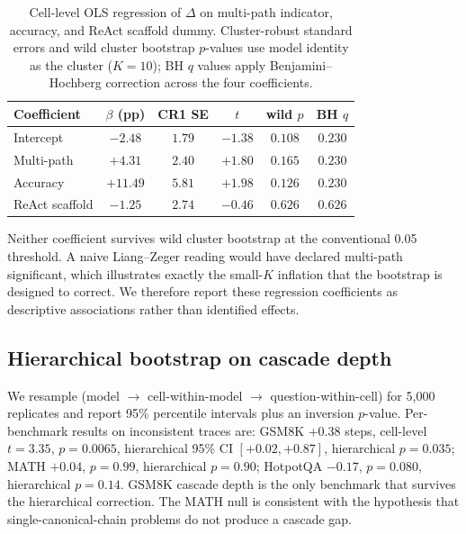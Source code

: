\documentclass[11pt]{article}
\begin{document}
\begin{table}[t]
\centering
\footnotesize
\setlength{\tabcolsep}{4pt}
\begin{tabular}{@{}lccccc@{}}
\toprule
\textbf{Coefficient} & $\beta$ (pp) & CR1 SE & $t$ & wild $p$ & BH $q$ \\
\midrule
Intercept       & $-2.48$  & $1.79$ & $-1.38$ & $0.108$ & $0.230$ \\
Multi-path      & $+4.31$  & $2.40$ & $+1.80$ & $0.165$ & $0.230$ \\
Accuracy        & $+11.49$ & $5.81$ & $+1.98$ & $0.126$ & $0.230$ \\
ReAct scaffold  & $-1.25$  & $2.74$ & $-0.46$ & $0.626$ & $0.626$ \\
\bottomrule
\end{tabular}
\caption{Cell-level OLS regression of $\Delta$ on multi-path indicator, accuracy, and ReAct scaffold dummy. Cluster-robust standard errors and wild cluster bootstrap $p$-values use model identity as the cluster ($K{=}10$); BH $q$ values apply Benjamini--Hochberg correction \citep{benjamini1995controlling} across the four coefficients.}
\label{tab:wild_K6}
\end{table}

Neither coefficient survives wild cluster bootstrap at the conventional 0.05 threshold. A naive Liang--Zeger reading would have declared multi-path significant, which illustrates exactly the small-$K$ inflation that the bootstrap is designed to correct. We therefore report these regression coefficients as descriptive associations rather than identified effects.

\subsection{Hierarchical bootstrap on cascade depth}

We resample (model $\to$ cell-within-model $\to$ question-within-cell) for 5{,}000 replicates and report 95\% percentile intervals plus an inversion $p$-value. Per-benchmark results on inconsistent traces are: GSM8K $+0.38$ steps, cell-level $t{=}3.35$, $p{=}0.0065$, hierarchical 95\% CI $[+0.02,+0.87]$, hierarchical $p{=}\mathbf{0.035}$; MATH $+0.04$, $p{=}0.99$, hierarchical $p{=}0.90$; HotpotQA $-0.17$, $p{=}0.080$, hierarchical $p{=}0.14$. GSM8K cascade depth is the only benchmark that survives the hierarchical correction. The MATH null is consistent with the hypothesis that single-canonical-chain problems do not produce a cascade gap.
\end{document}
